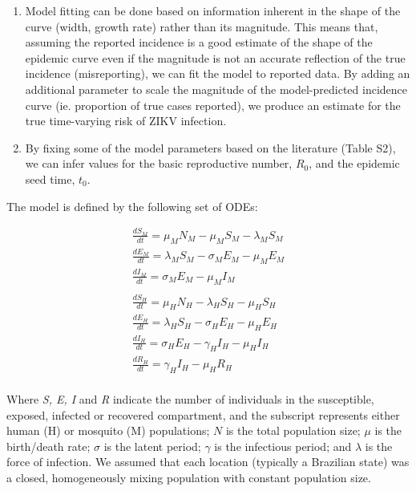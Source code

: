 \documentclass[10pt,letterpaper]{article}
\begin{document}
\begin{enumerate}
\def\labelenumi{\arabic{enumi}.}
\item
  Model fitting can be done based on information inherent in the shape
  of the curve (width, growth rate) rather than its magnitude. This
  means that, assuming the reported incidence is a good estimate of the
  shape of the epidemic curve even if the magnitude is not an accurate
  reflection of the true incidence (misreporting), we can fit the model
  to reported data. By adding an additional parameter to scale the
  magnitude of the model-predicted incidence curve (ie. proportion of
  true cases reported), we produce an estimate for the true time-varying
  risk of ZIKV infection.
\item
  By fixing some of the model parameters based on the literature (Table
  S2), we can infer values for the basic reproductive number, \(R_0\),
  and the epidemic seed time, \(t_0\).
\end{enumerate}

The model is defined by the following set of ODEs:

\begin{equation}
\begin{array}{lr}
\frac{dS_M}{dt} = \mu_MN_M - \mu_MS_M - \lambda_MS_M \\
\frac{dE_M}{dt} = \lambda_MS_M - \sigma_ME_M - \mu_ME_M  \\
\frac{dI_M}{dt} = \sigma_ME_M - \mu_MI_M \\
\\
\frac{dS_H}{dt} = \mu_HN_H - \lambda_HS_H - \mu_HS_H\\
\frac{dE_H}{dt} = \lambda_HS_H - \sigma_HE_H - \mu_HE_H\\
\frac{dI_H}{dt} = \sigma_HE_H - \gamma_HI_H - \mu_HI_H\\
\frac{dR_H}{dt} = \gamma_HI_H - \mu_HR_H\\
\end{array}
\label{eq:seir}
\end{equation}

Where \emph{S, E, I} and \emph{R} indicate the number of individuals in
the susceptible, exposed, infected or recovered compartment, and the
subscript represents either human (H) or mosquito (M) populations; \(N\)
is the total population size; \(\mu\) is the birth/death rate;
\(\sigma\) is the latent period; \(\gamma\) is the infectious period;
and \(\lambda\) is the force of infection. We assumed that each location
(typically a Brazilian state) was a closed, homogeneously mixing
population with constant population size.
\end{document}

